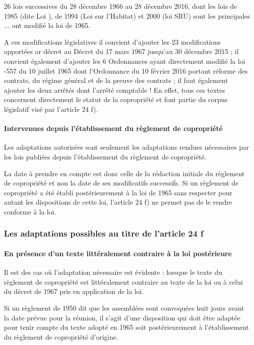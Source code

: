 				26 lois successives du 28 décembre 1966 au 28 décembre 2016, dont les lois de 1985 (dite Loi ), de 1994 (Loi sur l’Habitat) et 2000 (loi SRU) sont les principales $\dots$ ont modifié la loi de 1965.
				
				A ces modifications législatives il convient d’ajouter les 23 modifications apportées ar décret au Décret du 17 mars 1967 jusqu’au 30 décembre 2015 ; il convient également d’ajouter les 6 Ordonnances ayant directement modifié la loi -557 du 10 juillet 1965 dont l’Ordonnance du 10 février 2016 portant réforme des contrats, du régime général et de la preuve des contrats ; il faut également ajouter les deux arrêtés dont l’arrêté comptable ! En effet, tous ces textes concernent directement le statut de la copropriété et font partie du corpus législatif visé par l’article 24 f).
			
			\paragraph{Intervenues depuis l’établissement du règlement de copropriété}
			
				Les adaptations autorisées sont seulement les adaptations rendues nécessaires par les lois publiées depuis l’établissement du règlement de copropriété.
		
				La date à prendre en compte est donc celle de la rédaction initiale du règlement de copropriété et non la date de ses modificatifs successifs. Si un règlement de copropriété a été établi postérieurement à la loi de 1965 sans respecter pour autant les dispositions de cette loi, l’article 24 f) ne permet pas de le rendre conforme à la loi.
			
		\subsubsection{Les adaptations possibles au titre de l’article 24 f}
		
			\paragraph{En présence d’un texte littéralement contraire à la loi postérieure}
			
				Il est des cas où l’adaptation nécessaire est évidente : lorsque le texte du règlement de copropriété est littéralement contraire au texte de la loi ou à celui du décret de 1967 pris en application de la loi.
				
				Si un règlement de 1950 dit que les assemblées sont convoquées huit jours avant la date prévue pour la réunion, il s’agit d’une disposition qui doit être adaptée pour tenir compte du texte adopté en 1965 soit postérieurement à l’établissement du règlement de copropriété d’origine.
				
